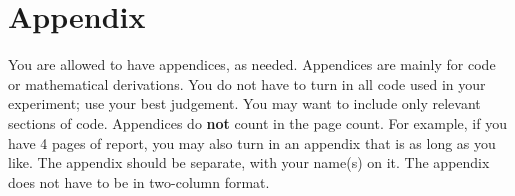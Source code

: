 \documentclass[final]{ieee}
\begin{document}
\newpage

\hbox{}


\newpage

\thispagestyle{empty}

\section*{Appendix}
You are allowed to have appendices, as needed. Appendices are mainly for
code or mathematical derivations. You do not have to turn in all code
used in your experiment; use your best judgement. You may want to
include only relevant sections of code. Appendices do {\bf not} count in the
page count. For example, if you have 4 pages of report, you may also
turn in an appendix that is as long as you like. The appendix should be
separate, with your name(s) on it. The appendix does not have to be in two-column
format. 
\end{document}
